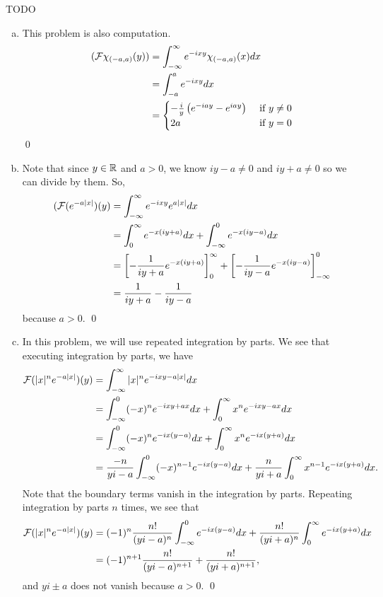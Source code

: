 \documentclass{article}
\begin{document}
\newpage
{} TODO  \tri
\hop 
\solution
\begin{enumerate}[(a)]
    \item This problem is also computation.
    \begin{align*}
        (\cal{F}\chi_{(-a,a)}(y)) &= \int_{-\infty}^\infty e^{-ixy}\chi_{(-a,a)}(x) dx \\
        &= \int_{-a}^a e^{-ixy}dx \\
        &=\begin{cases}
            -\frac{i}{y}\del{e^{-iay}-e^{iay}} &\text{ if } y \ne 0\\
            2a &\text{ if } y =0
        \end{cases}
    \end{align*}
    \qed
    \item  Note that since $y \in \RR$ and $a > 0$, we know $iy - a \ne 0$ and $iy+a \ne 0$ so we can divide by them. So, 
    \begin{align*}
        (\cal{F}(e^{-a|x|})(y) &= \int_{-\infty}^{\infty}e^{-ixy}e^{a|x|}dx\\
        &= \int_{0}^{\infty}e^{-x(iy+a)}dx+\int_{-\infty}^{0}e^{-x(iy-a)}dx \\
        &= \sbr{-\frac{1}{iy+a}e^{-x(iy+a)}}_0^\infty+\sbr{-\frac{1}{iy-a}e^{-x(iy-a)}}_{-\infty}^0\\
        &= \frac{1}{iy+a} - \frac{1}{iy-a}
    \end{align*}
    because $a>0$. \qed
    \item In this problem, we will use repeated integration by parts. We see that executing integration by parts, we have
    \begin{align*}
        \cal{F}(|x|^ne^{-a|x|})(y) &= \int_{-\infty}^\infty |x|^ne^{-ixy-a|x|} dx\\
        &=  \int_{-\infty}^0 (-x)^ne^{-ixy+ax} dx+   \int_0^\infty x^ne^{-ixy-ax}dx\\
        &=  \int_{-\infty}^0 (-x)^ne^{-ix(y-a)} dx+   \int_0^\infty x^ne^{-ix(y+a)}dx \\
        &=  \frac{-n}{yi-a}\int_{-\infty}^0 (-x)^{n-1}e^{-ix(y-a)} dx+  \frac{n}{yi+a} \int_0^\infty x^{n-1}e^{-ix(y+a)}dx.
    \end{align*}
    Note that the boundary terms vanish in the integration by parts. Repeating integration by parts $n$ times, we see that
    \begin{align*}
        \cal{F}(|x|^ne^{-a|x|})(y) &= (-1)^n\frac{n!}{(yi-a)^n}\int_{-\infty}^0 e^{-ix(y-a)} dx+  \frac{n!}{(yi+a)^n} \int_0^\infty e^{-ix(y+a)}dx\\
        &=  (-1)^{n+1}\frac{n!}{(yi-a)^{n+1}}+  \frac{n!}{(yi+a)^{n+1}},
    \end{align*}
    and $yi\pm a$ does not vanish because $a>0$. \qed
\end{enumerate}
\end{document}
